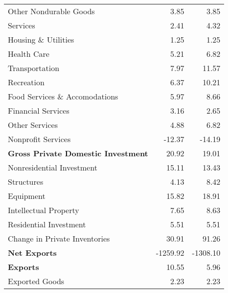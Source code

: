 \documentclass[11pt, letterpaper]{article}\usepackage[]{graphicx}\usepackage[]{color}
\begin{document}
\begin{table}[H]
\begin{tabular}{lrr}
  \hspace{24mm}  Other Nondurable Goods & 3.85 & 3.85 \\ 
  \hspace{8mm}  Services & 2.41 & 4.32 \\ 
  \hspace{16mm}  Housing \& Utilities & 1.25 & 1.25 \\ 
  \hspace{16mm}  Health Care & 5.21 & 6.82 \\ 
  \hspace{16mm}  Transportation & 7.97 & 11.57 \\ 
  \hspace{16mm}  Recreation & 6.37 & 10.21 \\ 
  \hspace{16mm}  Food Services \& Accomodations & 5.97 & 8.66 \\ 
  \hspace{16mm}  Financial Services & 3.16 & 2.65 \\ 
  \hspace{16mm}  Other Services & 4.88 & 6.82 \\ 
  \hspace{16mm}  Nonprofit Services & -12.37 & -14.19 \\ 
  \hspace{0mm} \textbf{Gross Private Domestic Investment} & 20.92 & 19.01 \\ 
  \hspace{8mm}  Nonresidential Investment & 15.11 & 13.43 \\ 
  \hspace{16mm}  Structures & 4.13 & 8.42 \\ 
  \hspace{16mm}  Equipment & 15.82 & 18.91 \\ 
  \hspace{16mm}  Intellectual Property & 7.65 & 8.63 \\ 
  \hspace{8mm}  Residential Investment & 5.51 & 5.51 \\ 
  \hspace{8mm}  Change in Private Inventories & 30.91 & 91.26 \\ 
  \hspace{0mm} \textbf{Net Exports} & -1259.92 & -1308.10 \\ 
  \hspace{0mm} \textbf{Exports} & 10.55 & 5.96 \\ 
  \hspace{8mm}  Exported Goods & 2.23 & 2.23 \\ 

\end{tabular}
\end{table}
\end{document}
